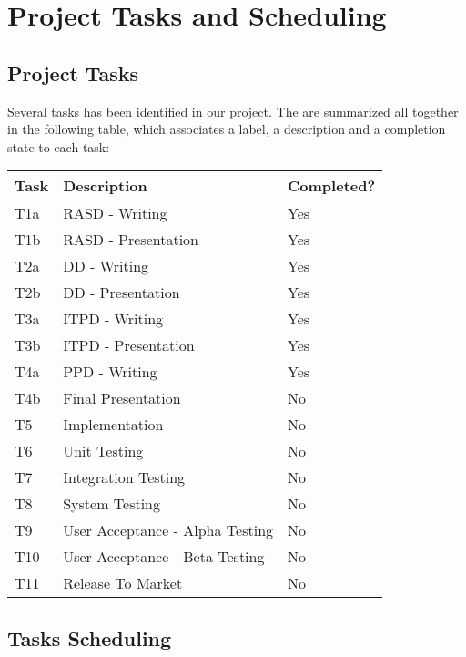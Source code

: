 \section{Project Tasks and Scheduling}
%
\subsection{Project Tasks}
Several tasks has been identified in our project.
The are summarized all together in the following table, which associates a label, a description and a completion state to each task:
\begin{center}
	\begin{tabulary}{\linewidth\tymin=70pt}{Y{2cm}|Y{6cm}|Y{2.25cm}}
		\textbf{Task} & \textbf{Description} & \textbf{Completed?}\\ \hline
		T1a & RASD - Writing & Yes \\ \hline
		T1b & RASD - Presentation & Yes \\ \hline
		T2a & DD - Writing & Yes \\ \hline
		T2b & DD - Presentation & Yes \\ \hline
		T3a & ITPD - Writing & Yes \\ \hline
		T3b & ITPD - Presentation & Yes \\ \hline
		T4a & PPD - Writing & Yes \\ \hline
		T4b & Final Presentation & No \\ \hline
		T5 & Implementation & No \\ \hline
		T6 & Unit Testing & No \\ \hline
		T7 & Integration Testing & No \\ \hline
		T8 & System Testing & No \\ \hline
		T9 & User Acceptance - Alpha Testing & No \\ \hline
		T10 & User Acceptance - Beta Testing & No \\ \hline
		T11 & Release To Market & No \\
	\end{tabulary}
\end{center}
%
\subsection{Tasks Scheduling}
\lipsum[100]
%
